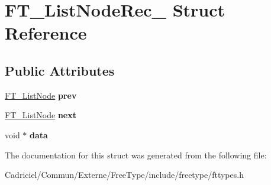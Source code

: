 \hypertarget{struct_f_t___list_node_rec__}{}\section{F\+T\+\_\+\+List\+Node\+Rec\+\_\+ Struct Reference}
\label{struct_f_t___list_node_rec__}
\subsection*{Public Attributes}
\begin{DoxyCompactItemize}
\item 
\hyperlink{struct_f_t___list_node_rec__}{F\+T\+\_\+\+List\+Node} {\bfseries prev}\hypertarget{struct_f_t___list_node_rec___a41c77950e6940b1b98e04709b705c046}{}\label{struct_f_t___list_node_rec___a41c77950e6940b1b98e04709b705c046}

\item 
\hyperlink{struct_f_t___list_node_rec__}{F\+T\+\_\+\+List\+Node} {\bfseries next}\hypertarget{struct_f_t___list_node_rec___a8275962fa8c92b77435cb4fa76251f39}{}\label{struct_f_t___list_node_rec___a8275962fa8c92b77435cb4fa76251f39}

\item 
void $\ast$ {\bfseries data}\hypertarget{struct_f_t___list_node_rec___ab0202be88f722442a4bec9aeb5f6418f}{}\label{struct_f_t___list_node_rec___ab0202be88f722442a4bec9aeb5f6418f}

\end{DoxyCompactItemize}


The documentation for this struct was generated from the following file\+:\begin{DoxyCompactItemize}
\item 
Cadriciel/\+Commun/\+Externe/\+Free\+Type/include/freetype/fttypes.\+h\end{DoxyCompactItemize}
